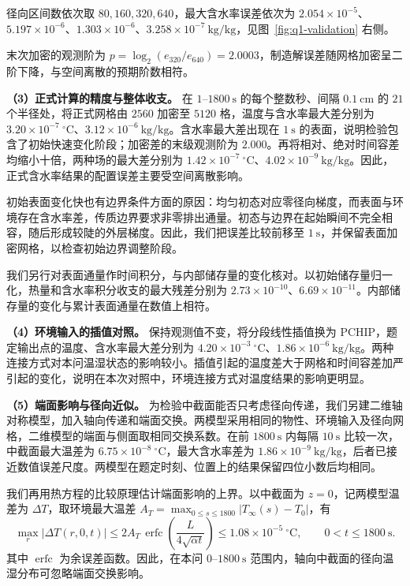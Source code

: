 \documentclass[UTF8,a4paper]{ctexart}
\begin{document}
径向区间数依次取 \(80,160,320,640\)，最大含水率误差依次为 \(2.054\times10^{-5}\)、\(5.197\times10^{-6}\)、\(1.303\times10^{-6}\)、\(3.258\times10^{-7}~\mathrm{kg/kg}\)，见图~\ref{fig:q1-validation} 右侧。

末次加密的观测阶为 \(p=\log_2(e_{320}/e_{640})=2.0003\)，制造解误差随网格加密呈二阶下降，与空间离散的预期阶数相符。

\noindent\textbf{（3）正式计算的精度与整体收支。}
在 \(1\)--\(1800~\mathrm s\) 的每个整数秒、间隔 \(0.1~\mathrm{cm}\) 的 \(21\) 个半径处，将正式网格由 \(2560\) 加密至 \(5120\) 格，温度与含水率最大差分别为 \(3.20\times10^{-7}~^\circ\mathrm C\)、\(3.12\times10^{-6}~\mathrm{kg/kg}\)。含水率最大差出现在 \(1~\mathrm s\) 的表面，说明检验包含了初始快速变化阶段；加密差的末级观测阶为 \(2.000\)。再将相对、绝对时间容差均缩小十倍，两种场的最大差分别为 \(1.42\times10^{-7}~^\circ\mathrm C\)、\(4.02\times10^{-9}~\mathrm{kg/kg}\)。因此，正式含水率结果的配置误差主要受空间离散影响。

初始表面变化快也有边界条件方面的原因：均匀初态对应零径向梯度，而表面与环境存在含水率差，传质边界要求非零排出通量。初态与边界在起始瞬间不完全相容，随后形成较陡的外层梯度。因此，我们把误差比较前移至 \(1~\mathrm s\)，并保留表面加密网格，以检查初始边界调整阶段。

我们另行对表面通量作时间积分，与内部储存量的变化核对。以初始储存量归一化，热量和含水率积分收支的最大残差分别为 \(2.73\times10^{-10}\)、\(6.69\times10^{-11}\)。内部储存量的变化与累计表面通量在数值上相符。

\noindent\textbf{（4）环境输入的插值对照。}
保持观测值不变，将分段线性插值换为 PCHIP，题定输出点的温度、含水率最大差分别为 \(4.20\times10^{-3}~^\circ\mathrm C\)、\(1.86\times10^{-6}~\mathrm{kg/kg}\)。两种连接方式对本问温湿状态的影响较小。插值引起的温度差大于网格和时间容差加严引起的变化，说明在本次对照中，环境连接方式对温度结果的影响更明显。

\noindent\textbf{（5）端面影响与径向近似。}
为检验中截面能否只考虑径向传递，我们另建二维轴对称模型，加入轴向传递和端面交换。两模型采用相同的物性、环境输入及径向网格，二维模型的端面与侧面取相同交换系数。在前 \(1800~\mathrm{s}\) 内每隔 \(10~\mathrm{s}\) 比较一次，中截面最大温差为 \(6.75\times10^{-8}~^\circ\mathrm C\)，最大含水率差为 \(1.86\times10^{-9}~\mathrm{kg/kg}\)，后者已接近数值误差尺度。两模型在题定时刻、位置上的结果保留四位小数后均相同。

我们再用热方程的比较原理估计端面影响的上界。以中截面为 \(z=0\)，记两模型温差为 \(\Delta T\)，取环境最大温差 \(A_T=\max_{0\le s\le1800}|T_\infty(s)-T_0|\)，有
\begin{equation}
\max_r|\Delta T(r,0,t)|
 \le 2A_T\,\operatorname{erfc}\!\left(\frac{L}{4\sqrt{\alpha t}}\right)
 \le 1.08\times10^{-5}~^\circ\mathrm C,\qquad 0<t\le1800~\mathrm{s}.
\label{eq:q1-end-bound}
\end{equation}
其中 \(\operatorname{erfc}\) 为余误差函数。因此，在本问 \(0\)--\(1800~\mathrm s\) 范围内，轴向中截面的径向温湿分布可忽略端面交换影响。
\end{document}
